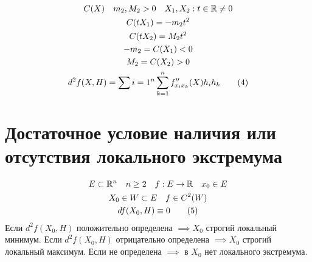 \documentclass[main]{subfiles}
\begin{document}
\begin{gather*}
    C(X) \quad m_2, M_2 > 0 \quad X_1, X_2 : t \in \mathbb{R} \ne 0 \\
    C(tX_1) = -m_2t^2 \\
    C(tX_2) = M_2t^2 \\
    -m_2 = C(X_1) < 0 \\
    M_2 = C(X_2) > 0 \\
    d^2 f(X,H) = \sum{i=1}^n\sum_{k=1}^n f^{\prime\prime}_{x_i x_k}(X) h_i h_k \tag{4}
\end{gather*}

\section{Достаточное условие наличия или отсутствия локального экстремума}

\begin{theorem}
    \begin{gather*}
        E \subset \mathbb{R}^n \quad n \geq 2 \quad f : E \rightarrow \mathbb{R} \quad x_0 \in E \\
        X_0 \in W \subset E \quad f \in C^2(W) \\
        df(X_0,H) \equiv 0 \tag{5} \\
    \end{gather*}
    Если $d^2f(X_0,H)$ положительно определена $\implies X_0$ строгий локальный минимум.
    Если $d^2f(X_0,H)$ отрицательно определена $\implies X_0$ строгий локальный максимум.
    Если не определена $\implies$ в $X_0$ нет локального экстремума.
\end{theorem}
\end{document}
